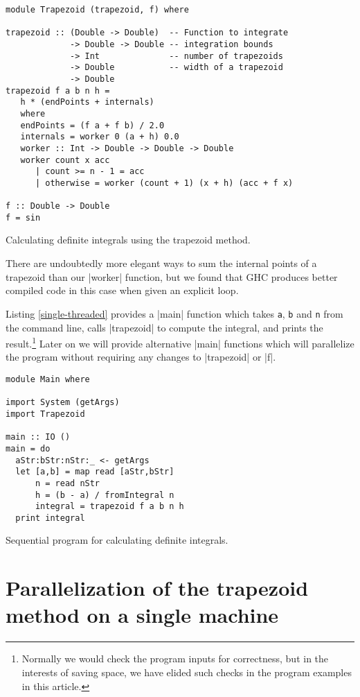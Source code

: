 \documentclass{tmr}
\begin{document}
\begin{listing}
\begin{Verbatim}
module Trapezoid (trapezoid, f) where

trapezoid :: (Double -> Double)  -- Function to integrate
             -> Double -> Double -- integration bounds
             -> Int              -- number of trapezoids
             -> Double           -- width of a trapezoid
             -> Double
trapezoid f a b n h =
   h * (endPoints + internals)
   where
   endPoints = (f a + f b) / 2.0
   internals = worker 0 (a + h) 0.0
   worker :: Int -> Double -> Double -> Double
   worker count x acc
      | count >= n - 1 = acc
      | otherwise = worker (count + 1) (x + h) (acc + f x)

f :: Double -> Double
f = sin
\end{Verbatim}
\caption{Calculating definite integrals using the trapezoid method. \label{Trapezoid}}
\end{listing}
There are undoubtedly more elegant ways to sum the internal points of a trapezoid
than our |worker| function, but we found that GHC produces better compiled code
in this case when given an explicit loop.

Listing \ref{single-threaded} provides a |main| function which takes
\verb|a|, \verb|b| and \verb|n| from the command line, calls |trapezoid| to compute the integral, and prints
the result.\footnote{Normally we would check the program inputs for correctness, but in
the interests of saving space, we have elided such checks in the program examples in this article.}
Later on we will provide alternative |main| functions which will parallelize the program
without requiring any changes to |trapezoid| or |f|.

\begin{listing}
\begin{Verbatim}
module Main where

import System (getArgs)
import Trapezoid

main :: IO ()
main = do
  aStr:bStr:nStr:_ <- getArgs
  let [a,b] = map read [aStr,bStr]
      n = read nStr
      h = (b - a) / fromIntegral n
      integral = trapezoid f a b n h
  print integral 
\end{Verbatim}
\caption{Sequential program for calculating definite integrals. \label{single-threaded}}
\end{listing}

\section{Parallelization of the trapezoid method on a single machine}
\end{document}
